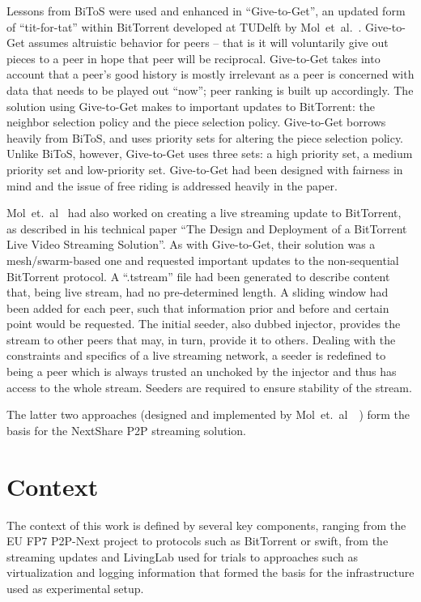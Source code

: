 Lessons from BiToS were used and enhanced in ``Give-to-Get'', an updated form
of ``tit-for-tat'' within BitTorrent developed at TUDelft by
Mol~et~al.~\cite{give-to-get}. Give-to-Get assumes altruistic behavior for
peers -- that is it will voluntarily give out pieces to a peer in hope that
peer will be reciprocal. Give-to-Get takes into account that a peer's good
history is mostly irrelevant as a peer is concerned with data that needs to be
played out ``now''; peer ranking is built up accordingly. The solution using
Give-to-Get makes to important updates to BitTorrent: the neighbor selection
policy and the piece selection policy. Give-to-Get borrows heavily from BiToS,
and uses priority sets for altering the piece selection policy. Unlike BiToS,
however, Give-to-Get uses three sets: a high priority set, a medium priority
set and low-priority set. Give-to-Get had been designed with fairness in mind
and the issue of free riding is addressed heavily in the paper.

Mol~et.~al~\cite{design-p2p-live} had also worked on creating a live streaming
update to BitTorrent, as described in his technical paper ``The Design and
Deployment of a BitTorrent Live Video Streaming Solution''. As with
Give-to-Get, their solution was a mesh/swarm-based one and requested important
updates to the non-sequential BitTorrent protocol. A ``.tstream'' file had
been generated to describe content that, being live stream, had no
pre-determined length. A sliding window had been added for each peer, such
that information prior and before and certain point would be requested. The
initial seeder, also dubbed injector, provides the stream to other peers that
may, in turn, provide it to others. Dealing with the constraints and specifics
of a live streaming network, a seeder is redefined to being a peer which is
always trusted an unchoked by the injector and thus has access to the whole
stream. Seeders are required to ensure stability of the stream.

The latter two approaches (designed and implemented by
Mol~et.~al~\cite{give-to-get}~\cite{design-p2p-live}) form the basis for the
NextShare P2P streaming solution.

\section{Context}
\label{sec:intro:context}

The context of this work is defined by several key components, ranging from
the EU FP7 P2P-Next project to protocols such as BitTorrent or swift, from
the streaming updates and LivingLab used for trials to approaches such as
virtualization and logging information that formed the basis for the
infrastructure used as experimental setup.

